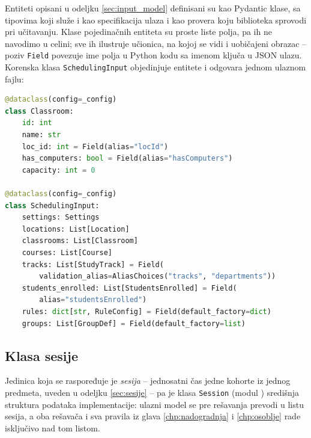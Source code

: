 \documentclass[12pt,oneside]{memoir}
\begin{document}
Entiteti opisani u odeljku \ref{sec:input_model} definisani su kao
Pydantic klase, sa tipovima koji služe i kao specifikacija ulaza i kao
provera koju biblioteka sprovodi pri učitavanju. Klase pojedinačnih
entiteta su proste liste polja, pa ih ne navodimo u celini; sve ih
ilustruje učionica, na kojoj se vidi i uobičajeni obrazac -- poziv
\texttt{Field} povezuje ime polja u Python kodu sa imenom ključa u
JSON ulazu. Korenska klasa \texttt{SchedulingInput} objedinjuje
entitete i odgovara jednom ulaznom fajlu:

\begin{english}
\begin{lstlisting}[language=Python, caption={Model ulaznih podataka (skraćeno)}, label={lst:pydantic_model}]
@dataclass(config=_config)
class Classroom:
    id: int
    name: str
    loc_id: int = Field(alias="locId")
    has_computers: bool = Field(alias="hasComputers")
    capacity: int = 0

@dataclass(config=_config)
class SchedulingInput:
    settings: Settings
    locations: List[Location]
    classrooms: List[Classroom]
    courses: List[Course]
    tracks: List[StudyTrack] = Field(
        validation_alias=AliasChoices("tracks", "departments"))
    students_enrolled: List[StudentsEnrolled] = Field(
        alias="studentsEnrolled")
    rules: dict[str, RuleConfig] = Field(default_factory=dict)
    groups: List[GroupDef] = Field(default_factory=list)
\end{lstlisting}
\end{english}

\subsection{Klasa sesije}
\label{sec:session_class}

Jedinica koja se raspoređuje je \emph{sesija} -- jednosatni čas jedne
kohorte iz jednog predmeta, uveden u odeljku \ref{sec:sesije} -- pa je
klasa \texttt{Session} (modul ) središnja struktura
podataka implementacije: ulazni model se pre rešavanja prevodi u listu
sesija, a oba rešavača i sva pravila iz glava \ref{chp:nadogradnja} i
\ref{chp:osoblje} rade isključivo nad tom listom.
\end{document}
